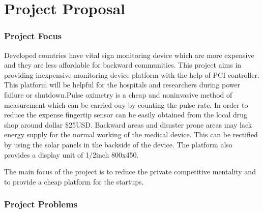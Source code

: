 
\chapter{Project Proposal}\label{chapter:firstchapter} %

\label{ChapterX} %







\subsection{Project Focus}


Developed countries have vital sign monitoring device which are more expensive and they are less affordable for backward communities. This project aims in providing inexpensive monitoring device platform with the help of PCI controller. This platform will be helpful for the hospitals and researchers during power failure or shutdown.Pulse oximetry is a cheap and noninvasive method of measurement which can be carried ouy by counting the pulse rate. In order to reduce the expense fingertip sensor can be easily obtained from the local drug shop around dollar \$25USD. Backward areas and disaster prone areas may lack energy supply for the normal working of the medical device. This can be rectified by using the solar panels in the backside of the device. The platform also provides a display unit of 1/2inch 800x450.

The main focus of the project is to reduce the private competitive mentality and to provide a cheap platform for the startups.
 


\subsection{Project Problems}

